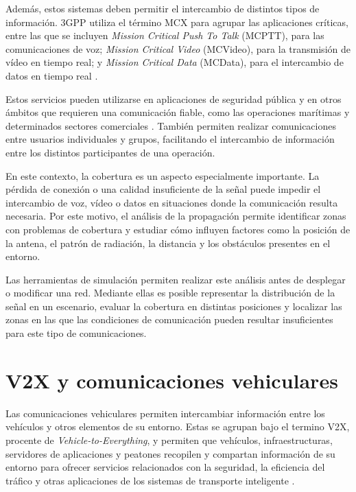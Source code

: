 Además, estos sistemas deben permitir el intercambio de distintos tipos de información. 3GPP utiliza el término MCX para agrupar las aplicaciones críticas, entre las que se incluyen \textit{Mission Critical Push To Talk} (MCPTT), para las comunicaciones de voz; \textit{Mission Critical Video} (MCVideo), para la transmisión de vídeo en tiempo real; y \textit{Mission Critical Data} (MCData), para el intercambio de datos en tiempo real \cite{etsi122280}.

Estos servicios pueden utilizarse en aplicaciones de seguridad pública y en otros ámbitos que requieren una comunicación fiable, como las operaciones marítimas y determinados sectores comerciales \cite{etsi122280}. También permiten realizar comunicaciones entre usuarios individuales y grupos, facilitando el intercambio de información entre los distintos participantes de una operación.

En este contexto, la cobertura es un aspecto especialmente importante. La pérdida de conexión o una calidad insuficiente de la señal puede impedir el intercambio de voz, vídeo o datos en situaciones donde la comunicación resulta necesaria. Por este motivo, el análisis de la propagación permite identificar zonas con problemas de cobertura y estudiar cómo influyen factores como la posición de la antena, el patrón de radiación, la distancia y los obstáculos presentes en el entorno.

Las herramientas de simulación permiten realizar este análisis antes de desplegar o modificar una red. Mediante ellas es posible representar la distribución de la señal en un escenario, evaluar la cobertura en distintas posiciones y localizar las zonas en las que las condiciones de comunicación pueden resultar insuficientes para este tipo de comunicaciones.


\section{V2X y comunicaciones vehiculares}

Las comunicaciones vehiculares permiten intercambiar información entre los vehículos y otros elementos de su entorno. Estas se agrupan bajo el termino V2X, procente de \textit{Vehicle-to-Everything}, y permiten que vehículos, infraestructuras, servidores de aplicaciones y peatones recopilen y compartan información de su entorno para ofrecer servicios relacionados con la seguridad, la eficiencia del tráfico y otras aplicaciones de los sistemas de transporte inteligente \cite{etsi122185}.

